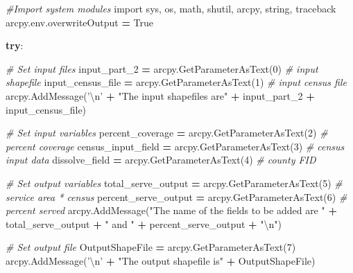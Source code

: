 \documentclass[11pt,]{article}
\newenvironment{Shaded}{\begin{snugshade}}{\end{snugshade}}
\newcommand{\DecValTok}[1]{\textcolor[rgb]{0.00,0.00,0.81}{{#1}}}
\newcommand{\CharTok}[1]{\textcolor[rgb]{0.31,0.60,0.02}{{#1}}}
\newcommand{\StringTok}[1]{\textcolor[rgb]{0.31,0.60,0.02}{{#1}}}
\newcommand{\ImportTok}[1]{{#1}}
\newcommand{\CommentTok}[1]{\textcolor[rgb]{0.56,0.35,0.01}{\textit{{#1}}}}
\newcommand{\VariableTok}[1]{\textcolor[rgb]{0.00,0.00,0.00}{{#1}}}
\newcommand{\ControlFlowTok}[1]{\textcolor[rgb]{0.13,0.29,0.53}{\textbf{{#1}}}}
\newcommand{\OperatorTok}[1]{\textcolor[rgb]{0.81,0.36,0.00}{\textbf{{#1}}}}
\newcommand{\NormalTok}[1]{{#1}}
\begin{document}
\begin{Shaded}
\begin{Highlighting}[]
\CommentTok{#Import system modules}
\ImportTok{import} \NormalTok{sys, os, math, shutil, arcpy, string, traceback}
\NormalTok{arcpy.env.overwriteOutput }\OperatorTok{=} \VariableTok{True}

\ControlFlowTok{try}\NormalTok{:}

    \CommentTok{# Set input files}
    \NormalTok{input_part_2         }\OperatorTok{=} \NormalTok{arcpy.GetParameterAsText(}\DecValTok{0}\NormalTok{) }\CommentTok{# input shapefile}
    \NormalTok{input_census_file    }\OperatorTok{=} \NormalTok{arcpy.GetParameterAsText(}\DecValTok{1}\NormalTok{) }\CommentTok{# input census file}
    \NormalTok{arcpy.AddMessage(}\StringTok{'}\CharTok{\textbackslash{}n}\StringTok{'} \OperatorTok{+} \StringTok{"The input shapefiles are"} \OperatorTok{+} \NormalTok{input_part_2 }\OperatorTok{+}
    \NormalTok{input_census_file)}

    \CommentTok{# Set input variables}
    \NormalTok{percent_coverage     }\OperatorTok{=} \NormalTok{arcpy.GetParameterAsText(}\DecValTok{2}\NormalTok{) }\CommentTok{# percent coverage}
    \NormalTok{census_input_field   }\OperatorTok{=} \NormalTok{arcpy.GetParameterAsText(}\DecValTok{3}\NormalTok{) }\CommentTok{# census input data}
    \NormalTok{dissolve_field       }\OperatorTok{=} \NormalTok{arcpy.GetParameterAsText(}\DecValTok{4}\NormalTok{) }\CommentTok{# county FID}

    \CommentTok{# Set output variables}
    \NormalTok{total_serve_output   }\OperatorTok{=} \NormalTok{arcpy.GetParameterAsText(}\DecValTok{5}\NormalTok{) }\CommentTok{# service area * census}
    \NormalTok{percent_serve_output }\OperatorTok{=} \NormalTok{arcpy.GetParameterAsText(}\DecValTok{6}\NormalTok{) }\CommentTok{# percent served}
    \NormalTok{arcpy.AddMessage(}\StringTok{"The name of the fields to be added are "} \OperatorTok{+} \NormalTok{total_serve_output}
    \OperatorTok{+} \StringTok{" and "} \OperatorTok{+} \NormalTok{percent_serve_output }\OperatorTok{+} \StringTok{"}\CharTok{\textbackslash{}n}\StringTok{"}\NormalTok{)}

    \CommentTok{# Set output file}
    \NormalTok{OutputShapeFile      }\OperatorTok{=} \NormalTok{arcpy.GetParameterAsText(}\DecValTok{7}\NormalTok{)}
    \NormalTok{arcpy.AddMessage(}\StringTok{'}\CharTok{\textbackslash{}n}\StringTok{'} \OperatorTok{+} \StringTok{"The output shapefile is"} \OperatorTok{+} \NormalTok{OutputShapeFile)}
\end{Highlighting}
\end{Shaded}
\end{document}
